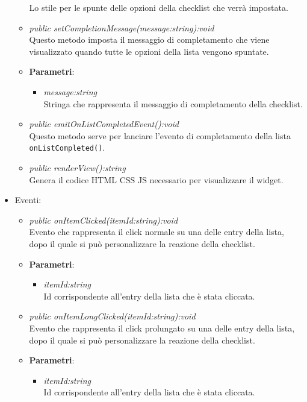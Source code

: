 \begin{itemize}
\begin{itemize}
{\begin{itemize}
		Lo stile per le spunte delle opzioni della checklist che verrà impostata.
		\end{itemize}} 
	\item \textit{public setCompletionMessage(message:string):void}\\
	Questo metodo imposta il messaggio di completamento che viene visualizzato quando tutte le opzioni della lista vengono spuntate.
		\item{\textbf{Parametri}: \begin{itemize}
		\item \textit{message:string}\\
		Stringa che rappresenta il messaggio di completamento della checklist.
		\end{itemize}}
	\item \textit{public emitOnListCompletedEvent():void}\\
	Questo metodo serve per lanciare l'evento di completamento della lista \texttt{onListCompleted()}.
	\item \textit{public renderView():string}\\
	Genera il codice HTML CSS JS necessario per visualizzare il widget.
	\end{itemize}
\item{Eventi}:
	\begin{itemize}
	\item \textit{public onItemClicked(itemId:string):void}\\
	Evento che rappresenta il click normale su una delle entry della lista, dopo il quale si può personalizzare la reazione della checklist.
		\item{\textbf{Parametri}: \begin{itemize}
		\item \textit{itemId:string}\\
		Id corrispondente all'entry della lista che è stata cliccata.
		\end{itemize}}
	\item \textit{public onItemLongClicked(itemId:string):void}\\
	Evento che rappresenta il click prolungato su una delle entry della lista, dopo il quale si può personalizzare la reazione della checklist.
		\item{\textbf{Parametri}: \begin{itemize}
		\item \textit{itemId:string}\\
		Id corrispondente all'entry della lista che è stata cliccata.
		\end{itemize}}
	\end{itemize}
\end{itemize}

